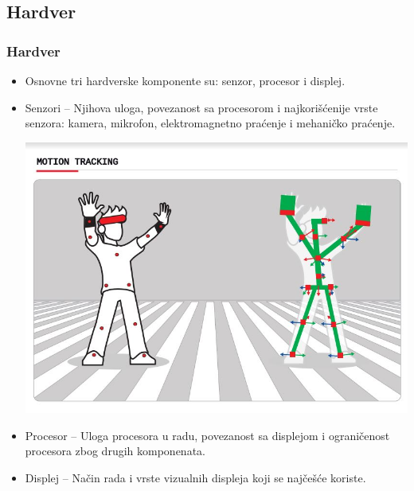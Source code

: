 \documentclass[9pt]{beamer}
\begin{document}
\subsection{Hardver}
	\begin{frame}
 \frametitle{Hardver}
        \begin{itemize}
            \setlength\itemsep{1.2em}
                \item Osnovne tri hardverske komponente su: senzor, procesor i displej.
                \item Senzori – Njihova uloga, povezanost sa procesorom i najkorišćenije vrste senzora: kamera, mikrofon, elektromagnetno praćenje i mehaničko 			praćenje.
		\begin{center}
		         	 \includegraphics[scale=0.23]{motion_tracking.jpg}
	           \end{center}
                \item Procesor – Uloga procesora u radu, povezanost sa displejom i ograničenost procesora zbog drugih komponenata.
                \item Displej – Način rada i vrste vizualnih displeja koji se najčešće koriste.
        \end{itemize}
            
	\end{frame}
\end{document}
